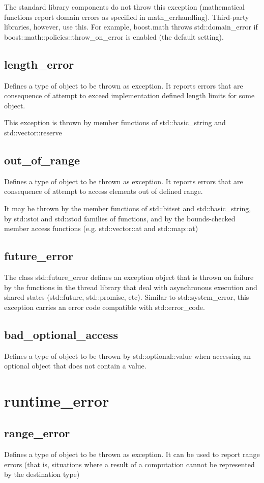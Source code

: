 \documentclass[UTF8,a4paper,12pt]{ctexbook}
\begin{document}
			The standard library components do not throw this exception (mathematical functions report domain errors as specified in math\_errhandling). Third-party libraries, however, use this. For example, boost.math throws std::domain\_error if boost::math::policies::throw\_on\_error is enabled (the default setting). 
		\subsection{length\_error}
			Defines a type of object to be thrown as exception. It reports errors that are consequence of attempt to exceed implementation defined length limits for some object.
			
			This exception is thrown by member functions of std::basic\_string and std::vector::reserve 
		\subsection{out\_of\_range}
			Defines a type of object to be thrown as exception. It reports errors that are consequence of attempt to access elements out of defined range.
			
			It may be thrown by the member functions of std::bitset and std::basic\_string, by std::stoi and std::stod families of functions, and by the bounds-checked member access functions (e.g. std::vector::at and std::map::at) 
		\subsection{future\_error}
			The class std::future\_error defines an exception object that is thrown on failure by the functions in the thread library that deal with asynchronous execution and shared states (std::future, std::promise, etc). Similar to std::system\_error, this exception carries an error code compatible with std::error\_code. 
		\subsection{bad\_optional\_access}
			Defines a type of object to be thrown by std::optional::value when accessing an optional object that does not contain a value. 
		
	\section{runtime\_error}
		\subsection{range\_error}
			Defines a type of object to be thrown as exception. It can be used to report range errors (that is, situations where a result of a computation cannot be represented by the destination type)
			
\end{document}
